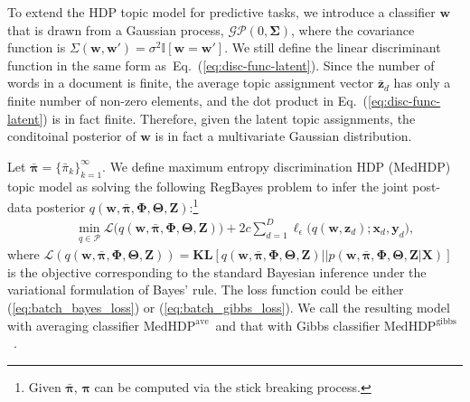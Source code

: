 \documentclass[twoside,11pt]{article}
\newcommand{\xv}{\bm{x}}
\newcommand{\Xv}{\bm{X}}
\newcommand{\yv}{\bm{y}}
\newcommand{\zv}{\bm{z}}
\newcommand{\Zv}{\bm{Z}}
\newcommand{\wv}{\bm{w}}
\newcommand{\Thetav}{\bm{\Theta}}
\newcommand{\Phiv}{\bm{\Phi}}
\newcommand{\piv}{\bm \pi}
\newcommand{\barpiv}{\bm{\bar{\pi}}}
\newcommand{\Sigmav}{\bm \Sigma}
\newcommand{\KL}{\textbf{KL}}
\newcommand{\ind}{\mathbb{I}}
\newcommand\MedHDPave{$\text{MedHDP}^{\text{ave}}$~}
\newcommand\MedHDPgibbs{$\text{MedHDP}^{\text{gibbs}}$~}
\newcommand{\strin}[1]{\todo[size=\small, color=green!40]{\bf\sf  #1}}
\newcommand{\jun}[1]{\marginpar{\color{blue}\tiny{Jun: #1}}}
\begin{document}
To extend the HDP topic model for predictive tasks, we introduce a classifier $\wv$ that is drawn from a Gaussian process, $\mathcal{GP}(0, \Sigmav)$, where the covariance function is $\Sigma(\wv, \wv') = \sigma^2 \ind[\wv = \wv']$. We still define the linear discriminant function in the same form as~Eq.~(\ref{eq:disc-func-latent}). Since the number of words in a document is finite, the average topic assignment vector $\bar{\zv}_{d}$ has only a finite number of non-zero elements, and the dot product in Eq.~(\ref{eq:disc-func-latent}) is in fact finite. Therefore, given the latent topic assignments, the conditoinal posterior of $\wv$ is in fact a multivariate Gaussian distribution.

Let $\bm{\bar{\pi}} = \{\bar{\pi}_k\}_{k=1}^{\infty}$. We define maximum entropy discrimination HDP (MedHDP) topic model as solving the following RegBayes problem to infer the joint post-data posterior $q(\wv, \barpiv, \Phiv, \Thetav,  \Zv)$:\footnote{Given $\barpiv$, $\piv$ can be computed via the stick breaking process.}
%
\setlength\arraycolsep{-2pt} \begin{eqnarray} \label{eq:medhdp}
&& \min\limits_{q \in \mathcal{P}}  {\mathcal{L}\Big( q(\wv, \barpiv, \Phiv, \Thetav, \Zv) \Big)}+ 2 c \sum\limits_{d=1}^{D}{\ell_{\epsilon}\Big( q(\wv, \zv_d); \xv_d, \yv_d \Big)},
\end{eqnarray}
%
where $\mathcal{L}( q(\wv, \barpiv, \Phiv, \Thetav, \Zv) ) = \KL[q(\wv, \barpiv, \Phiv, \Thetav, \Zv) || p(\wv, \barpiv, \Phiv, \Thetav,  \Zv | \Xv)]$ is the objective corresponding to the standard Bayesian inference under the variational formulation of Bayes' rule. The loss function could be either (\ref{eq:batch_bayes_loss}) or (\ref{eq:batch_gibbs_loss}). We call the resulting model with averaging classifier \MedHDPave and that with Gibbs classifier \MedHDPgibbs.
\end{document}
